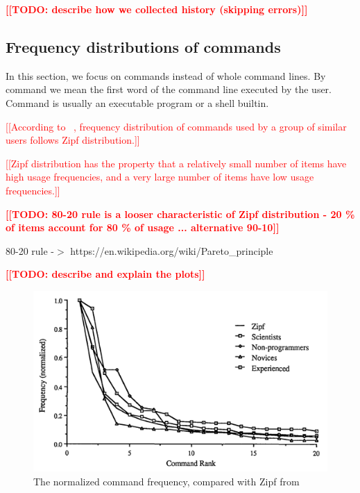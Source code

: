 \documentclass[thesis=M,english]{FITthesis}[2012/10/20]
\newcommand{\blind}[1][1]{}
\newcommand{\todotext}[1]{\textcolor{red}{\textbf{[[#1]]}}}
\newcommand{\redtext}[1]{\textcolor{red}{[[#1]]}}
\newcommand{\tmpframe}[1]{\fbox{#1}}
\renewcommand{\tmpframe}[1]{#1}
\let\myCite\cite
\renewcommand\cite{\unskip~\myCite}
\begin{document}
\todotext{TODO: describe how we collected history (skipping errors)}
\blind

\subsection{Frequency distributions of commands}

In this section, we focus on commands instead of whole command lines. By command we mean the first word of the command line executed by the user. Command is usually an executable program or a shell builtin.

\redtext{According to \cite{greenberg1993computer}, frequency distribution of commands used by a group of similar users follows Zipf distribution.}

\redtext{Zipf distribution has the property that a relatively small number of items have high usage frequencies, and a very large number of items have low usage frequencies.}

\todotext{TODO: 80-20 rule is a looser characteristic of Zipf distribution - 20 \% of items account for 80 \% of usage ... alternative 90-10}
\blind
80-20 rule -$>$ https://en.wikipedia.org/wiki/Pareto\_principle



\todotext{TODO: describe and explain the plots}





\begin{figure}
  \tmpframe{\includegraphics[width=\linewidth]{figures/greenberg/plot_ref_zipf-cmd-frq.png}}
  \caption{The normalized command frequency, compared with Zipf from \cite{greenberg1993computer}}
\end{figure}
\end{document}
